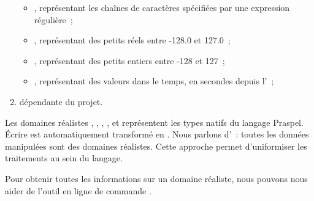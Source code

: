 \begin{enumerate}[couche 1]
\begin{itemize}
    \item {}, représentant les chaînes de caractères spécifiées par une
    expression régulière~;

    \item {}, représentant des petits réels entre -128.0 et
    127.0~;

    \item {}, représentant des petits entiers entre -128 et
    127~;

    \item {}, représentant des valeurs dans le temps, en secondes
    depuis l'~;

    \end{itemize}

\item dépendante du projet.

\end{enumerate}
%
Les domaines réalistes , ,
, ,  et
 représentent les types natifs du langage Praspel. Écrire
 est automatiquement transformé en . Nous
parlons d'~: toutes les données manipulées sont des
domaines réalistes. Cette approche permet d'uniformiser les traitements au sein
du langage.

Pour obtenir toutes les informations sur un domaine réaliste, nous pouvons nous
aider de l'outil en ligne de commande .

